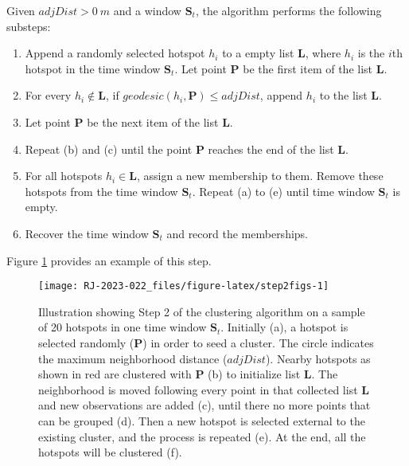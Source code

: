 Given \(adjDist>0~m\) and a window \(\boldsymbol{S}_t\), the algorithm performs the following substeps:

\begin{enumerate}
\def\labelenumi{(\alph{enumi})}
\item
  Append a randomly selected hotspot \(h_i\) to a empty list \(\boldsymbol{L}\), where \(h_i\) is the \(i\)th hotspot in the time window \(\boldsymbol{S}_t\). Let point \(\boldsymbol{P}\) be the first item of the list \(\boldsymbol{L}\).
\item
  For every \(h_i \notin \boldsymbol{L}\), if \(geodesic(h_i, \boldsymbol{P})\leq adjDist\), append \(h_i\) to the list \(\boldsymbol{L}\).
\item
  Let point \(\boldsymbol{P}\) be the next item of the list \(\boldsymbol{L}\).
\item
  Repeat (b) and (c) until the point \(\boldsymbol{P}\) reaches the end of the list \(\boldsymbol{L}\).
\item
  For all hotspots \(h_i \in \boldsymbol{L}\), assign a new membership to them. Remove these hotspots from the time window \(\boldsymbol{S}_t\). Repeat (a) to (e) until time window \(\boldsymbol{S}_t\) is empty.
\item
  Recover the time window \(\boldsymbol{S}_t\) and record the memberships.
\end{enumerate}

\noindent Figure \ref{fig:step2figs} provides an example of this step.

\begin{figure}

{\centering \texttt{[image: RJ-2023-022\_files/figure-latex/step2figs-1]} 

}

\caption{Illustration showing Step 2 of the clustering algorithm on a sample of 20 hotspots in one time window $\boldsymbol{S}_t$. Initially (a), a hotspot is selected randomly ($\boldsymbol{P}$) in order to seed a cluster. The circle indicates the maximum neighborhood distance ($adjDist$). Nearby hotspots as shown in red are clustered with $\boldsymbol{P}$ (b) to initialize list $\boldsymbol{L}$. The neighborhood is moved following every point in that collected list $\boldsymbol{L}$ and new observations are added (c), until there no more points that can be grouped (d). Then a new hotspot is selected external to the existing cluster, and the process is repeated (e). At the end, all the hotspots will be clustered (f).}\label{fig:step2figs}
\end{figure}

